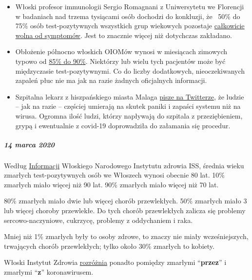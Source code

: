 \begin{itemize}
\tightlist
\item
  Włoski profesor immunologii Sergio Romagnani z Uniwersytetu we
  Florencji w badaniach nad trzema tysiącami osób dochodzi do konkluzji,
  że~ 50\% do 75\% osób test-pozytywnych wszystkich grup wiekowych
  pozostaje
  \href{https://www.repubblica.it/salute/medicina-e-ricerca/2020/03/16/news/coronavirus_studio_il_50-75_dei_casi_a_vo_sono_asintomatici_e_molto_contagiosi-251474302/}{całkowicie
  wolna od symptomów}. Jest to znacznie więcej niż dotychczas zakładano.
\item
  Obłożenie północno włoskich OIOMów wynosi w miesiącach zimowych typowo
  od
  \href{https://jamanetwork.com/journals/jama/fullarticle/2763188}{85\%
  do 90\%}. Niektórzy lub wielu tych pacjentów może być międzyczasie
  test-pozytywnymi. Co do liczby dodatkowych, nieoczekiwanych zapaleń
  płuc nie ma jak na razie żadnych oficjalnych informacji.
\item
  Szpitalna lekarz z hiszpańskiego miasta Malaga
  \href{https://twitter.com/NeurologaenSAS/status/1239498772570308609}{pisze
  na Twitterze}, że ludzie -- jak na razie -- częściej umierają na
  skutek paniki i zapaści systemu niż na wirusa. Ogromna ilość ludzi,
  którzy napływają do szpitala z przeziębieniem, grypą i ewentualnie z
  covid-19 doprowadziła do załamania się procedur.
\end{itemize}

\hypertarget{14-marca-2020}{%
\subparagraph{\texorpdfstring{\textbf{14 marca
2020}}{14 marca 2020}}\label{14-marca-2020}}

Według
\href{https://www.epicentro.iss.it/coronavirus/sars-cov-2-decessi-italia}{Informacji}
Włoskiego Narodowego Instytutu zdrowia ISS, średnia wieku zmarłych
test-pozytywnych osób we Włoszech wynosi obecnie 80 lat. 10\% zmarłych
miało więcej niż 90 lat. 90\% zmarłych miało więcej niż 70 lat.

80\% zmarłych miało dwie lub więcej chorób przewlekłych. 50\% zmarłych
miało 3 lub więcej choroby przewlekłe. Do tych chorób przewlekłych
zalicza się problemy sercowo-naczyniowe, cukrzycę, problemy z
oddychaniem i raka.

Mniej niż 1\% zmarłych były to osoby zdrowe, to znaczy nie miały
wcześniejszych, trwających chorób przewlekłych; tylko około 30\%
zmarłych to kobiety.

Włoski Instytut Zdrowia
\href{https://youtu.be/0M4kbPDHGR0?t=210}{rozróżnia} ponadto pomiędzy
zmarłymi ``\textbf{przez}'' i zmarłymi ``\textbf{z}'' koronawirusem.

